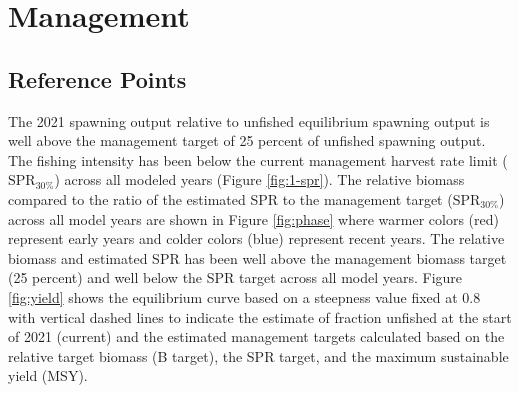\documentclass[11pt,
  english,
  a4paper,
]{article}
\begin{document}
\leavevmode\tagmcend\tagstructend\par


\hypertarget{management}{%
\section{Management}\label{management}}

\leavevmode\tagmcend\tagstructend


\hypertarget{reference-points-1}{%
\subsection{Reference Points}\label{reference-points-1}}

\leavevmode\tagmcend\tagstructend


The 2021 spawning output relative to unfished equilibrium spawning output is well above the management target of 25 percent of unfished spawning output. The fishing intensity has been below the current management harvest rate limit ({\(\text{SPR}_{30\%}\)\leavevmode\tagmcend\tagstructend}) across all modeled years (Figure \ref{fig:1-spr}). The relative biomass compared to the ratio of the estimated SPR to the management target ({\(\text{SPR}_{30\%}\)\leavevmode\tagmcend\tagstructend}) across all model years are shown in Figure \ref{fig:phase} where warmer colors (red) represent early years and colder colors (blue) represent recent years. The relative biomass and estimated SPR has been well above the management biomass target (25 percent) and well below the SPR target across all model years. Figure \ref{fig:yield} shows the equilibrium curve based on a steepness value fixed at 0.8 with vertical dashed lines to indicate the estimate of fraction unfished at the start of 2021 (current) and the estimated management targets calculated based on the relative target biomass (B target), the SPR target, and the maximum sustainable yield (MSY).

\leavevmode\tagmcend\tagstructend\par

\end{document}
